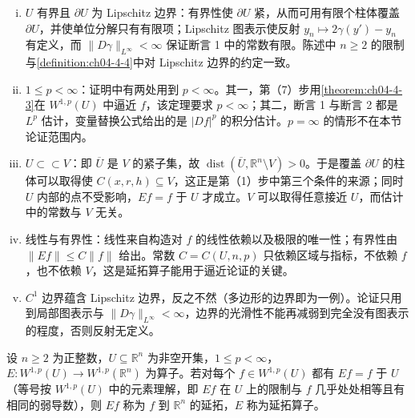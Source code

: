 \documentclass[../../main.tex]{subfiles}%
\begin{document}
\begin{remark}\label{remark:ch04-thm-4-7-条件}
\begin{enumerate}[(i)]
\item $U$ 有界且 $\partial U$ 为 Lipschitz 边界：有界性使 $\partial U$ 紧，从而可用有限个柱体覆盖 $\partial U$，并使单位分解只有有限项；Lipschitz 图表示使反射 $y_n\mapsto2\gamma(y')-y_n$ 有定义，而 $\lVert D\gamma\rVert_{L^\infty}<\infty$ 保证断言 1 中的常数有限。陈述中 $n\geqslant2$ 的限制与\cref{definition:ch04-4-4}中对 Lipschitz 边界的约定一致。%
\item $1\leqslant p<\infty$：证明中有两处用到 $p<\infty$。其一，第（7）步用\cref{theorem:ch04-4-3}在 $W^{1,p}(U)$ 中逼近 $f$，该定理要求 $p<\infty$；其二，断言 1 与断言 2 都是 $L^p$ 估计，变量替换公式给出的是 $\lvert Df\rvert^p$ 的积分估计。$p=\infty$ 的情形不在本节论证范围内。%
\item $U\subset\subset V$：即 $\overline{U}$ 是 $V$ 的紧子集，故 $\operatorname{dist}(\overline{U},\mathbb{R}^n\setminus V)>0$。于是覆盖 $\partial U$ 的柱体可以取得使 $C(x,r,h)\subseteq V$，这正是第（1）步中第三个条件的来源；同时 $U$ 内部的点不受影响，$Ef=f$ 于 $U$ 才成立。$V$ 可以取得任意接近 $U$，而估计中的常数与 $V$ 无关。
\item 线性与有界性：线性来自构造对 $f$ 的线性依赖以及极限的唯一性；有界性由 $\lVert Ef\rVert\leqslant C\lVert f\rVert$ 给出。常数 $C=C(U,n,p)$ 只依赖区域与指标，不依赖 $f$，也不依赖 $V$，这是延拓算子能用于逼近论证的关键。
\item $C^1$ 边界蕴含 Lipschitz 边界，反之不然（多边形的边界即为一例）。论证只用到局部图表示与 $\lVert D\gamma\rVert_{L^\infty}<\infty$，边界的光滑性不能再减弱到完全没有图表示的程度，否则反射无定义。
\end{enumerate}
\end{remark}

\begin{definition}[延拓]\label{definition:ch04-4-6}
设 $n\geqslant2$ 为正整数，$U\subseteq\mathbb{R}^n$ 为非空开集，$1\leqslant p<\infty$，$E:W^{1,p}(U)\to W^{1,p}(\mathbb{R}^n)$ 为算子。若对每个 $f\in W^{1,p}(U)$ 都有 $Ef=f$ 于 $U$（等号按 $W^{1,p}(U)$ 中的元素理解，即 $Ef$ 在 $U$ 上的限制与 $f$ 几乎处处相等且有相同的弱导数），则 $Ef$ 称为 $f$ 到 $\mathbb{R}^n$ 的延拓，$E$ 称为延拓算子。
\end{definition}
\end{document}
